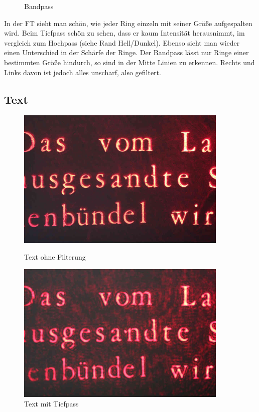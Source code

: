 \begin{figure}[H]
\begin{minipage}{0.33\textwidth}
                    \caption{Bandpass}
                  \end{minipage}
            \end{figure}
In der FT sieht man schön, wie jeder Ring einzeln mit seiner Größe aufgespalten wird. Beim Tiefpass schön zu sehen, dass er kaum Intensität herausnimmt, im vergleich zum Hochpass (siehe Rand Hell/Dunkel). Ebenso sieht man wieder einen Unterschied in der Schärfe der Ringe. Der Bandpass lässt nur Ringe einer bestimmten Größe hindurch, so sind in der Mitte Linien zu erkennen. Rechts und Links davon ist jedoch alles unscharf, also gefiltert.

        \subsection*{Text}
            \begin{figure}[H]
                  \begin{minipage}{0.45\textwidth}
                   \centering
                    \includegraphics[width=0.9\textwidth]{Abb/Abb_13.JPG}
                    \caption{Text ohne Filterung}
                  \end{minipage}\hfill
                  \begin{minipage}{0.45\textwidth}
                   \centering
                    \includegraphics[width=0.9\textwidth]{Abb/Abb_14.JPG}
                    \caption{Text mit Tiefpass}
                  \end{minipage}
            \end{figure}
